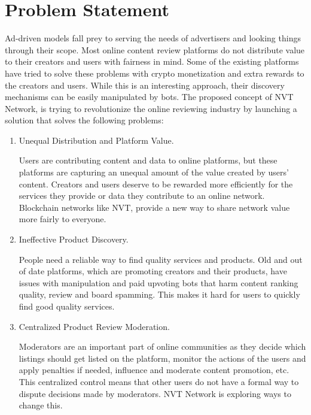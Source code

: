 
\chapter{Problem Statement} %

\label{Chapter2} %

Ad-driven models fall prey to serving the needs of advertisers and looking things through their scope. Most online content review platforms do not distribute value to their creators and users with fairness in mind. Some of the existing platforms have tried to solve these problems with crypto monetization and extra rewards to the creators and users. While this is an interesting approach, their discovery mechanisms can be easily manipulated by bots. The proposed concept of NVT Network, is trying to revolutionize the online reviewing industry by launching a solution that solves the following problems:

\begin{enumerate}
\item Unequal Distribution and Platform Value.

Users are contributing content and data to online platforms, but these platforms are capturing an unequal amount of the value created by users' content. Creators and users deserve to be rewarded more efficiently for the services they provide or data they contribute to an online network. Blockchain networks like NVT, provide a new way to share network value more fairly to everyone.

\item Ineffective Product Discovery.

People need a reliable way to find quality services and products. Old and out of date platforms, which are promoting creators and their products, have issues with manipulation and paid upvoting bots that harm content ranking quality, review and board spamming. This makes it hard for users to quickly find good quality services.

\item Centralized Product Review Moderation.

Moderators are an important part of online communities as they decide which listings should get listed on the platform, monitor the actions of the users and apply penalties if needed, influence and moderate content promotion, etc. This centralized control means that other users do not have a formal way to dispute decisions made by moderators. NVT Network is exploring ways to change this.

\end{enumerate}

